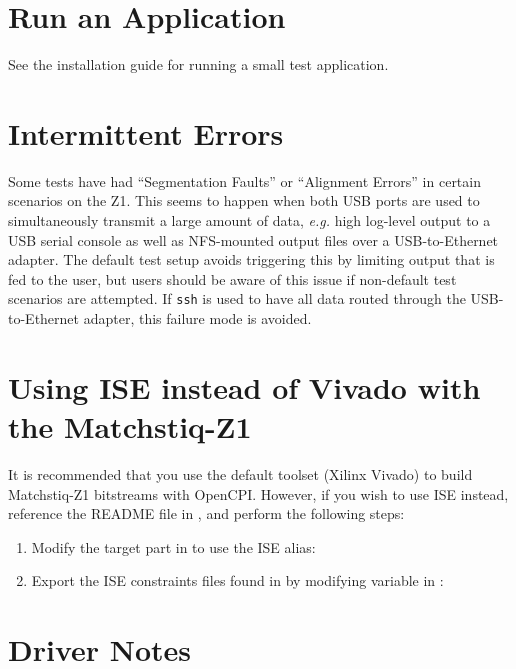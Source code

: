 \section{Run an Application}
See the installation guide for running a small test application.
\pagebreak
\begin{appendices}

\section{Intermittent Errors}
Some tests have had ``Segmentation Faults'' or ``Alignment Errors'' in certain scenarios on the Z1. This seems to happen when both USB ports are used to simultaneously transmit a large amount of data, \textit{e.g.} high log-level output to a USB serial console as well as NFS-mounted output files over a USB-to-Ethernet adapter. The default test setup avoids triggering this by limiting output that is fed to the user, but users should be aware of this issue if non-default test scenarios are attempted. If \texttt{ssh} is used to have all data routed through the USB-to-Ethernet adapter, this failure mode is avoided.
\section{Using ISE instead of Vivado with the Matchstiq-Z1}
It is recommended that you use the default toolset (Xilinx Vivado) to build Matchstiq-Z1 bitstreams with OpenCPI. However, if you wish to use ISE instead, reference the README file in , and perform the following steps:
\begin{enumerate}
\item{Modify the target part in  to use the ISE alias:
\subitem {}}
\item{Export the ISE constraints files found in  by modifying  variable in :
\subitem {}}
\end{enumerate}
\section{Driver Notes}

%
\end{appendices}

